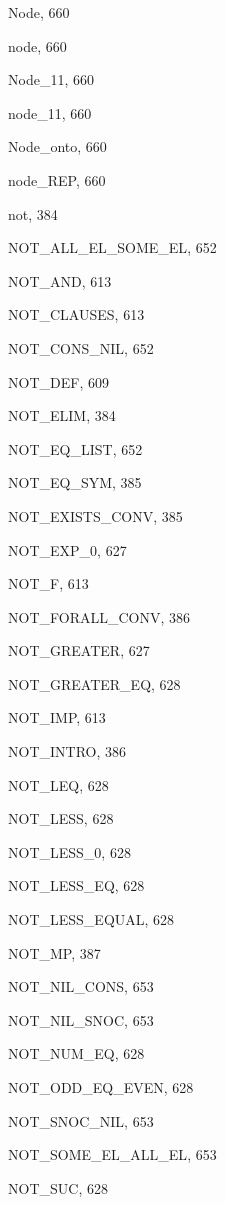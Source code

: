 \begin{theindex}
  \item {\ptt Node}, 660
  \item {\ptt node}, 660
  \item {\ptt Node\_11}, 660
  \item {\ptt node\_11}, 660
  \item {\ptt Node\_onto}, 660
  \item {\ptt node\_REP}, 660
  \item {\ptt not}, 384
  \item {\ptt NOT\_ALL\_EL\_SOME\_EL}, 652
  \item {\ptt NOT\_AND}, 613
  \item {\ptt NOT\_CLAUSES}, 613
  \item {\ptt NOT\_CONS\_NIL}, 652
  \item {\ptt NOT\_DEF}, 609
  \item {\ptt NOT\_ELIM}, 384
  \item {\ptt NOT\_EQ\_LIST}, 652
  \item {\ptt NOT\_EQ\_SYM}, 385
  \item {\ptt NOT\_EXISTS\_CONV}, 385
  \item {\ptt NOT\_EXP\_0}, 627
  \item {\ptt NOT\_F}, 613
  \item {\ptt NOT\_FORALL\_CONV}, 386
  \item {\ptt NOT\_GREATER}, 627
  \item {\ptt NOT\_GREATER\_EQ}, 628
  \item {\ptt NOT\_IMP}, 613
  \item {\ptt NOT\_INTRO}, 386
  \item {\ptt NOT\_LEQ}, 628
  \item {\ptt NOT\_LESS}, 628
  \item {\ptt NOT\_LESS\_0}, 628
  \item {\ptt NOT\_LESS\_EQ}, 628
  \item {\ptt NOT\_LESS\_EQUAL}, 628
  \item {\ptt NOT\_MP}, 387
  \item {\ptt NOT\_NIL\_CONS}, 653
  \item {\ptt NOT\_NIL\_SNOC}, 653
  \item {\ptt NOT\_NUM\_EQ}, 628
  \item {\ptt NOT\_ODD\_EQ\_EVEN}, 628
  \item {\ptt NOT\_SNOC\_NIL}, 653
  \item {\ptt NOT\_SOME\_EL\_ALL\_EL}, 653
  \item {\ptt NOT\_SUC}, 628

\end{theindex}
